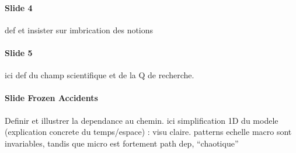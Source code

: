 \documentclass[11pt]{article}
\begin{document}
\paragraph{Slide 4}

def et insister sur imbrication des notions

\paragraph{Slide 5}

ici def du champ scientifique et de la Q de recherche.


\paragraph{Slide Frozen Accidents}

Definir et illustrer la dependance au chemin. ici simplification 1D du modele (explication concrete du temps/espace) : visu claire. patterns echelle macro sont invariables, tandis que micro est fortement path dep, ``chaotique''
\end{document}
